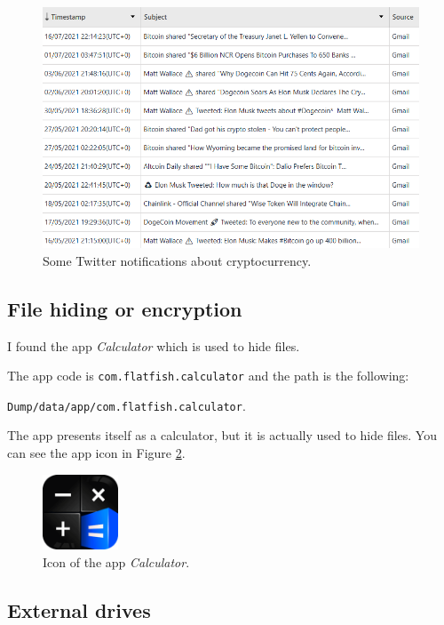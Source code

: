 \documentclass[12pt]{article}
\begin{document}
\begin{figure}[!ht]
    \centering
    \includegraphics[width=\textwidth]{images/gmail-crypto.png}
    \caption{Some Twitter notifications about cryptocurrency.}
    \label{fig:twitter}
\end{figure}

\subsection{File hiding or encryption}
\label{sec:file-hiding}

I found the app \textit{Calculator} \cite{calculator} which is used to hide files.

The app code is \texttt{com.flatfish.calculator} and the path is the following:

\texttt{Dump/data/app/com.flatfish.calculator}. 

The app presents itself as a calculator, but it is actually used to hide files. You can see the app icon in Figure \ref{fig:calc}.

\begin{figure}[!ht]
    \centering
    \includegraphics[width=0.2\textwidth]{images/icon.png}
    \caption{Icon of the app \textit{Calculator}.}
    \label{fig:calc}
\end{figure}

\subsection{External drives}
\end{document}
